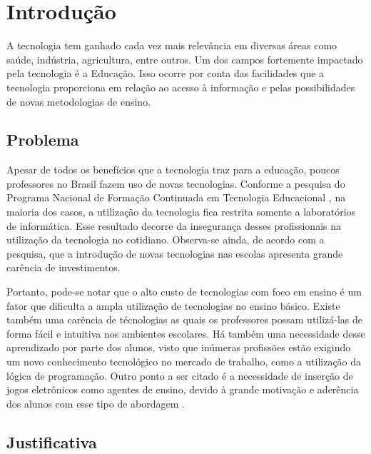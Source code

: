 
\chapter{Introdução} \label{cap:intro}

A tecnologia tem ganhado cada vez mais relevância em diversas áreas como saúde, indústria, agricultura, entre outros. Um dos campos fortemente impactado pela tecnologia é a Educação. Isso ocorre por conta das facilidades que a tecnologia proporciona em relação ao acesso à informação e pelas possibilidades de novas metodologias de ensino. 


\section{Problema}

Apesar de todos os benefícios que a tecnologia traz para a educação, poucos professores no Brasil fazem uso de novas tecnologias. Conforme a pesquisa do Programa Nacional de Formação Continuada em Tecnologia Educacional \cite{suenia_andre_2012}, na maioria dos casos, a utilização da tecnologia fica restrita somente a laboratórios de informática. Esse resultado decorre da insegurança desses profissionais na utilização da tecnologia no cotidiano. Observa-se ainda, de acordo com a pesquisa, que a introdução de novas tecnologias nas escolas apresenta grande carência de investimentos.

Portanto, pode-se notar que o alto custo de  tecnologias com foco em ensino é um fator que dificulta a ampla utilização de tecnologias no ensino básico. Existe também uma carência de técnologias as quais os professores possam utilizá-las de forma fácil e intuitiva nos ambientes escolares. Há também uma necessidade desse aprendizado por parte dos alunos, visto que inúmeras profissões estão exigindo um novo conhecimento tecnológico no mercado de trabalho, como a utilização da lógica de programação. Outro ponto a ser citado é a necessidade de inserção de jogos eletrônicos como agentes de ensino, devido à grande motivação e aderência dos alunos com esse tipo de abordagem \cite{kaue_tatiane_marcos_2017}.


\section{Justificativa}

